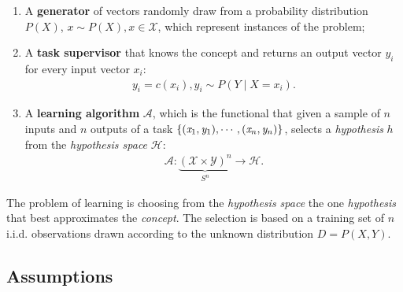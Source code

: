 \documentclass[
  letterpaper,
  12pt,
  british]{tufte-book}
\theoremstyle{plain}
\theoremstyle{definition}
\theoremstyle{plain}
\theoremstyle{remark}
\begin{document}
\begin{enumerate}
\def\labelenumi{\arabic{enumi}.}
\item
  A \textbf{generator} of vectors randomly draw from a probability
  distribution \(P(\mathit{X})\),
  \(x\sim P(\mathit{X}), x \in \mathcal{X}\), which represent
  instances of the problem;
\item
  A \textbf{task supervisor} that knows the concept and returns an
  output vector \(\mathit{y}_i\) for every input vector
  \(\mathit{x}_i\): \begin{align}
          \mathit{y}_i = c(\mathit{x}_i),  \mathit{y}_i \sim P(\mathit{Y}\mid \mathit{X}=\mathit{x}_i).
  \end{align}
\item
  A \textbf{learning algorithm} \(\mathcal{A}\), which is the functional
  that given a sample of \(n\) inputs and \(n\) outputs of a task
  \(\small \{(\mathit{x}_1,\mathit{y}_1), \cdots, (\mathit{x}_n, \mathit{y}_n)\}\),
  selects a \emph{hypothesis} \(h\) from the \emph{hypothesis
  space}
  \(\mathcal{H}\): \begin{align}
          \mathcal{A}: \underbrace{(\mathcal{X}\times \mathcal{Y})^n}_{S^n} \to \mathcal{H}.
  \end{align}
\end{enumerate}

The problem of learning is choosing from the \emph{hypothesis space} the
one \emph{hypothesis} that best approximates the \emph{concept}. The
selection is based on a training set of \(n\) i.i.d. observations drawn
according to the unknown distribution \(D= P(\mathit{X},\mathit{Y})\).

\hypertarget{mlt_assumptions}{%
\subsection{Assumptions}\label{mlt_assumptions}}
\end{document}
